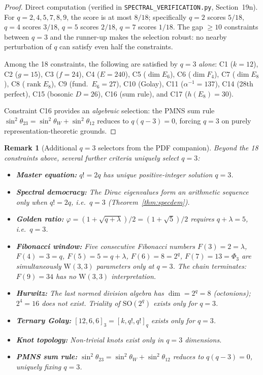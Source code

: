 \documentclass[12pt,a4paper]{article}
\newtheorem{remark}[theorem]{Remark}
\newcommand{\W}{\mathrm{W}(3,3)}
\begin{document}
\begin{proof}
Direct computation (verified in \texttt{SPECTRAL\_VERIFICATION.py},
Section~19n).  For $q = 2, 4, 5, 7, 8, 9$, the score is at most
$8/18$; specifically $q = 2$ scores $5/18$, $q = 4$ scores $3/18$,
$q = 5$ scores $2/18$, $q = 7$ scores $1/18$.
The gap $\geq 10$ constraints between $q = 3$ and the runner-up
makes the selection robust: no nearby perturbation of $q$ can
satisfy even half the constraints.

Among the 18 constraints, the following are satisfied by $q = 3$
\emph{alone}: C1 ($k = 12$), C2 ($g = 15$), C3 ($f = 24$),
C4 ($E = 240$), C5 ($\dim E_6$), C6 ($\dim F_4$), C7 ($\dim E_8$),
C8 ($\operatorname{rank} E_8$), C9 (fund.\ $E_6 = 27$),
C10 (Golay), C11 ($\alpha^{-1} = 137$), C14 (28th perfect),
C15 (bosonic $D = 26$), C16 (sum rule), and C17 ($h(E_8) = 30$).

Constraint C16 provides an \emph{algebraic} selection:
the PMNS sum rule $\sin^2\theta_{23} = \sin^2\theta_W + \sin^2\theta_{12}$
reduces to $q(q - 3) = 0$, forcing $q = 3$ on purely
representation-theoretic grounds.
\end{proof}

\begin{remark}[Additional $q=3$ selectors from the PDF companion]
Beyond the 18 constraints above, several further criteria uniquely select $q=3$:
\begin{itemize}
  \item \textbf{Master equation:} $q!=2q$ has unique positive-integer solution $q=3$.
  \item \textbf{Spectral democracy:} The Dirac eigenvalues form an arithmetic
        sequence only when $q!=2q$, i.e.\ $q=3$ (Theorem~\ref{thm:specdem}).
  \item \textbf{Golden ratio:} $\varphi = (1+\sqrt{q+\lambda})/2 = (1+\sqrt{5})/2$
        requires $q+\lambda=5$, i.e.\ $q=3$.
  \item \textbf{Fibonacci window:} Five consecutive Fibonacci numbers
        $F(3)=2=\lambda$, $F(4)=3=q$, $F(5)=5=q+\lambda$, $F(6)=8=2^q$,
        $F(7)=13=\Phi_3$ are simultaneously $\W$ parameters only at $q=3$.
        The chain terminates: $F(9)=34$ has no $\W$ interpretation.
  \item \textbf{Hurwitz:} The last normed division algebra has $\dim=2^q=8$
        (octonions); $2^4=16$ does not exist. Triality of $\mathrm{SO}(2^q)$
        exists only for $q=3$.
  \item \textbf{Ternary Golay:} $[12,6,6]_3 = [k,q!,q!]_q$ exists only for $q=3$.
  \item \textbf{Knot topology:} Non-trivial knots exist only in $q=3$ dimensions.
  \item \textbf{PMNS sum rule:} $\sin^2\theta_{23}=\sin^2\theta_W+\sin^2\theta_{12}$
        reduces to $q(q-3)=0$, uniquely fixing $q=3$.
\end{itemize}
\end{remark}
\end{document}

